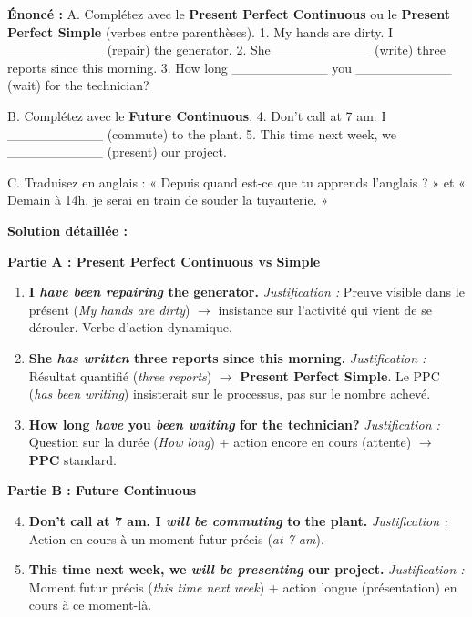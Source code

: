 \documentclass[11pt]{article}
\begin{document}
\begin{exoresolu}
\textbf{Énoncé :}
A. Complétez avec le \textbf{Present Perfect Continuous} ou le \textbf{Present Perfect Simple} (verbes entre parenthèses).
1. My hands are dirty. I \_\_\_\_\_\_\_\_\_\_ (repair) the generator.
2. She \_\_\_\_\_\_\_\_\_\_ (write) three reports since this morning.
3. How long \_\_\_\_\_\_\_\_\_\_ you \_\_\_\_\_\_\_\_\_\_ (wait) for the technician?

B. Complétez avec le \textbf{Future Continuous}.
4. Don't call at 7 am. I \_\_\_\_\_\_\_\_\_\_ (commute) to the plant.
5. This time next week, we \_\_\_\_\_\_\_\_\_\_ (present) our project.

C. Traduisez en anglais : « Depuis quand est-ce que tu apprends l'anglais ? » et « Demain à 14h, je serai en train de souder la tuyauterie. »

\tcblower
\textbf{Solution détaillée :}

\textbf{Partie A : Present Perfect Continuous vs Simple}
\begin{enumerate}
    \item \textbf{I \emph{have been repairing} the generator.}
    \emph{Justification :} Preuve visible dans le présent (\emph{My hands are dirty}) $\rightarrow$ insistance sur l'activité qui vient de se dérouler. Verbe d'action dynamique.
    \item \textbf{She \emph{has written} three reports since this morning.}
    \emph{Justification :} Résultat quantifié (\emph{three reports}) $\rightarrow$ \textbf{Present Perfect Simple}. Le PPC (\emph{has been writing}) insisterait sur le processus, pas sur le nombre achevé.
    \item \textbf{How long \emph{have} you \emph{been waiting} for the technician?}
    \emph{Justification :} Question sur la durée (\emph{How long}) + action encore en cours (attente) $\rightarrow$ \textbf{PPC} standard.
\end{enumerate}

\textbf{Partie B : Future Continuous}
\begin{enumerate}
    \setcounter{enumi}{3}
    \item \textbf{Don't call at 7 am. I \emph{will be commuting} to the plant.}
    \emph{Justification :} Action en cours à un moment futur précis (\emph{at 7 am}).
    \item \textbf{This time next week, we \emph{will be presenting} our project.}
    \emph{Justification :} Moment futur précis (\emph{this time next week}) + action longue (présentation) en cours à ce moment-là.
\end{enumerate}


\end{exoresolu}
\end{document}
